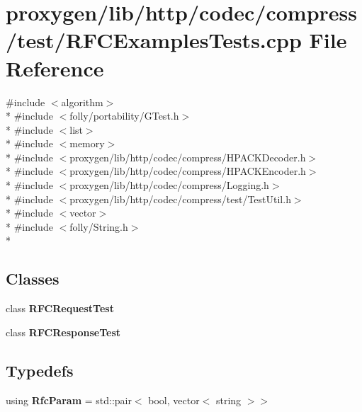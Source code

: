 \section{proxygen/lib/http/codec/compress/test/\+R\+F\+C\+Examples\+Tests.cpp File Reference}
\label{RFCExamplesTests_8cpp}
{\ttfamily \#include $<$algorithm$>$}\\*
{\ttfamily \#include $<$folly/portability/\+G\+Test.\+h$>$}\\*
{\ttfamily \#include $<$list$>$}\\*
{\ttfamily \#include $<$memory$>$}\\*
{\ttfamily \#include $<$proxygen/lib/http/codec/compress/\+H\+P\+A\+C\+K\+Decoder.\+h$>$}\\*
{\ttfamily \#include $<$proxygen/lib/http/codec/compress/\+H\+P\+A\+C\+K\+Encoder.\+h$>$}\\*
{\ttfamily \#include $<$proxygen/lib/http/codec/compress/\+Logging.\+h$>$}\\*
{\ttfamily \#include $<$proxygen/lib/http/codec/compress/test/\+Test\+Util.\+h$>$}\\*
{\ttfamily \#include $<$vector$>$}\\*
{\ttfamily \#include $<$folly/\+String.\+h$>$}\\*
\subsection*{Classes}
\begin{DoxyCompactItemize}
\item 
class {\bf R\+F\+C\+Request\+Test}
\item 
class {\bf R\+F\+C\+Response\+Test}
\end{DoxyCompactItemize}
\subsection*{Typedefs}
\begin{DoxyCompactItemize}
\item 
using {\bf Rfc\+Param} = std\+::pair$<$ bool, vector$<$ string $>$$>$
\end{DoxyCompactItemize}
